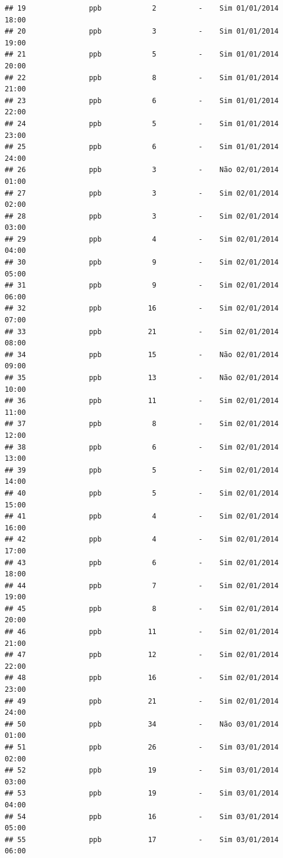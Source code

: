 \documentclass[]{book}
\begin{document}
\begin{verbatim}
## 19               ppb            2          -    Sim 01/01/2014 18:00
## 20               ppb            3          -    Sim 01/01/2014 19:00
## 21               ppb            5          -    Sim 01/01/2014 20:00
## 22               ppb            8          -    Sim 01/01/2014 21:00
## 23               ppb            6          -    Sim 01/01/2014 22:00
## 24               ppb            5          -    Sim 01/01/2014 23:00
## 25               ppb            6          -    Sim 01/01/2014 24:00
## 26               ppb            3          -    Não 02/01/2014 01:00
## 27               ppb            3          -    Sim 02/01/2014 02:00
## 28               ppb            3          -    Sim 02/01/2014 03:00
## 29               ppb            4          -    Sim 02/01/2014 04:00
## 30               ppb            9          -    Sim 02/01/2014 05:00
## 31               ppb            9          -    Sim 02/01/2014 06:00
## 32               ppb           16          -    Sim 02/01/2014 07:00
## 33               ppb           21          -    Sim 02/01/2014 08:00
## 34               ppb           15          -    Não 02/01/2014 09:00
## 35               ppb           13          -    Não 02/01/2014 10:00
## 36               ppb           11          -    Sim 02/01/2014 11:00
## 37               ppb            8          -    Sim 02/01/2014 12:00
## 38               ppb            6          -    Sim 02/01/2014 13:00
## 39               ppb            5          -    Sim 02/01/2014 14:00
## 40               ppb            5          -    Sim 02/01/2014 15:00
## 41               ppb            4          -    Sim 02/01/2014 16:00
## 42               ppb            4          -    Sim 02/01/2014 17:00
## 43               ppb            6          -    Sim 02/01/2014 18:00
## 44               ppb            7          -    Sim 02/01/2014 19:00
## 45               ppb            8          -    Sim 02/01/2014 20:00
## 46               ppb           11          -    Sim 02/01/2014 21:00
## 47               ppb           12          -    Sim 02/01/2014 22:00
## 48               ppb           16          -    Sim 02/01/2014 23:00
## 49               ppb           21          -    Sim 02/01/2014 24:00
## 50               ppb           34          -    Não 03/01/2014 01:00
## 51               ppb           26          -    Sim 03/01/2014 02:00
## 52               ppb           19          -    Sim 03/01/2014 03:00
## 53               ppb           19          -    Sim 03/01/2014 04:00
## 54               ppb           16          -    Sim 03/01/2014 05:00
## 55               ppb           17          -    Sim 03/01/2014 06:00

\end{verbatim}
\end{document}
